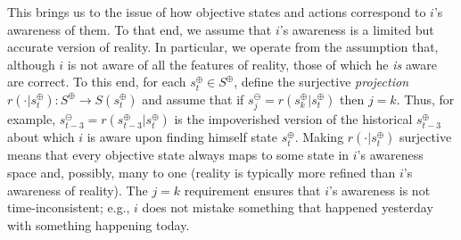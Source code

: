 \documentclass[
11pt,
titlepage,
reqno,
]{article}%
\theoremstyle{definition}
\begin{document}


This brings us to the issue of how objective states and actions correspond to $i$'s awareness of them.
To that end, we assume that $i$'s awareness is a limited but accurate version of reality.
In particular, we  operate from the assumption that, although $i$ is not aware of all the features of reality,  those of which he \textit{is} aware are correct.  
To this end, for each $s^\oplus_t\in S^\oplus$, define the surjective \textit{projection} $r(\cdot|s^\oplus_t):S^\oplus\rightarrow S(s^\oplus_t)$ and assume that if $s^\ominus_j=r(s^\oplus_k|s^\oplus_t)$ then $j=k$.
Thus, for example,  $s^\ominus_{t-3}=r(s^\oplus_{t-3}|s^\oplus_t)$ is the impoverished version of the historical $s^\oplus_{t-3}$ about which $i$ is aware upon finding himself state $s^\oplus_t$.
Making $r(\cdot|s^\oplus_t)$ surjective means that every objective state always maps to some state in $i$'s awareness space and, possibly, many to one (reality is typically more refined than $i$'s awareness of reality).
The  $j=k$ requirement ensures that $i$'s awareness is not time-inconsistent; e.g., $i$ does not mistake something that happened yesterday with something happening today.
\end{document}
